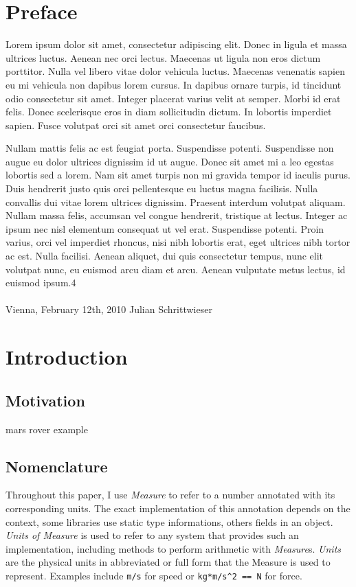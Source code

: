 \documentclass[12pt,oneside,a4paper]{scrbook}
\theoremstyle{definition}
\begin{document}
\chapter*{Preface}

Lorem ipsum dolor sit amet, consectetur adipiscing elit. Donec in ligula et massa ultrices luctus. Aenean nec orci lectus. Maecenas ut ligula non eros dictum porttitor. Nulla vel libero vitae dolor vehicula luctus. Maecenas venenatis sapien eu mi vehicula non dapibus lorem cursus. In dapibus ornare turpis, id tincidunt odio consectetur sit amet. Integer placerat varius velit at semper. Morbi id erat felis. Donec scelerisque eros in diam sollicitudin dictum. In lobortis imperdiet sapien. Fusce volutpat orci sit amet orci consectetur faucibus.

Nullam mattis felis ac est feugiat porta. Suspendisse potenti. Suspendisse non augue eu dolor ultrices dignissim id ut augue. Donec sit amet mi a leo egestas lobortis sed a lorem. Nam sit amet turpis non mi gravida tempor id iaculis purus. Duis hendrerit justo quis orci pellentesque eu luctus magna facilisis. Nulla convallis dui vitae lorem ultrices dignissim. Praesent interdum volutpat aliquam. Nullam massa felis, accumsan vel congue hendrerit, tristique at lectus. Integer ac ipsum nec nisl elementum consequat ut vel erat. Suspendisse potenti. Proin varius, orci vel imperdiet rhoncus, nisi nibh lobortis erat, eget ultrices nibh tortor ac est. Nulla facilisi. Aenean aliquet, dui quis consectetur tempus, nunc elit volutpat nunc, eu euismod arcu diam et arcu. Aenean vulputate metus lectus, id euismod ipsum.4
\\ \\
Vienna, February 12th, 2010  \hfill Julian Schrittwieser

\singlespacing
\tableofcontents

\chapter{Introduction}
\setcounter{page}{1}

\section{Motivation}
mars rover example

\section{Nomenclature}
Throughout this paper, I use \emph{Measure} to refer to a number annotated with its corresponding units. The exact implementation of this annotation depends on the context, some libraries use static type informations, others fields in an object. \emph{Units of Measure} is used to refer to any system that provides such an implementation, including methods to perform arithmetic with \emph{Measure}s. \emph{Units} are the physical units in abbreviated or full form that the Measure is used to represent. Examples include \verb|m/s| for speed or \verb|kg*m/s^2 == N| for force.
\end{document}
